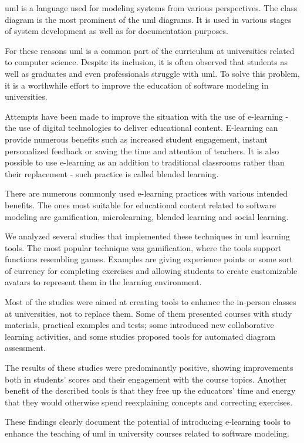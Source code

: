 \ac{uml} is a language used for modeling systems from various perspectives. The class diagram is the most prominent of the \ac{uml} diagrams. It is used in various stages of system development as well as for documentation purposes. 

For these reasons \ac{uml} is a common part of the curriculum at universities related to computer science. Despite its inclusion, it is often observed that students as well as graduates and even professionals struggle with \ac{uml}. To solve this problem, it is a worthwhile effort to improve the education of software modeling in universities.

Attempts have been made to improve the situation with the use of e-learning - the use of digital technologies to deliver educational content. E-learning can provide numerous benefits such as increased student engagement, instant personalized feedback or saving the time and attention of teachers. It is also possible to use e-learning as an addition to traditional classrooms rather than their replacement - such practice is called blended learning. 

There are numerous commonly used e-learning practices with various intended benefits. The ones most suitable for educational content related to software modeling are gamification, microlearning, blended learning and social learning.

We analyzed several studies that implemented these techniques in \ac{uml} learning tools. The most popular technique was gamification, where the tools support functions resembling games. Examples are giving experience points or some sort of currency for completing exercises and allowing students to create customizable avatars to represent them in the learning environment.

Most of the studies were aimed at creating tools to enhance the in-person classes at universities, not to replace them. Some of them presented courses with study materials, practical examples and tests; some introduced new collaborative learning activities, and some studies proposed tools for automated diagram assessment.

The results of these studies were predominantly positive, showing improvements both in students' scores and their engagement with the course topics. Another benefit of the described tools is that they free up the educators' time and energy that they would otherwise spend reexplaining concepts and correcting exercises.

These findings clearly document the potential of introducing e-learning tools to enhance the teaching of \ac{uml} in university courses related to software modeling. 

